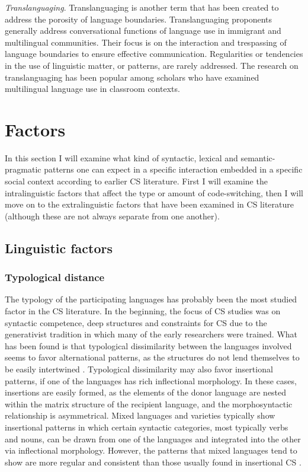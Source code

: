 \documentclass[output=paper,
modfonts
]{langscibook}
\begin{document}
\textit{Translanguaging}. \parencite{garcia2009education,creese2010translanguaging,garcia2014translanguaging} Translanguaging is another term that has been created to address the porosity of language boundaries. Translanguaging proponents generally address conversational functions of language use in immigrant and multilingual communities. Their focus is on the interaction and  trespassing of language boundaries to ensure effective communication. Regularities or tendencies in the use of linguistic matter, or patterns, are rarely addressed. The research on translanguaging has been popular among scholars who have examined multilingual language use in classroom contexts.

\section {Factors}

In this section I will examine what kind of syntactic, lexical and semantic-pragmatic patterns one can expect in a specific interaction embedded in a specific social context according to earlier CS literature. First I will examine the intralinguistic factors that affect the type or amount of code-switching, then I will move on to the extralinguistic factors that have been examined in CS literature (although these are not always separate from one another).

\subsection{Linguistic factors} 

\subsubsection*{Typological distance}


The typology of the participating languages has probably been the most studied factor in the CS literature. In the beginning, the focus of CS studies was on syntactic competence, deep structures and constraints for CS due to the generativist tradition in which many of the early researchers were trained. What has been found is that typological dissimilarity between the languages involved seems to favor alternational patterns, as the structures do not lend themselves to be easily intertwined \parencite{muysken2000,muysken2013language}. Typological dissimilarity may also favor insertional patterns, if one of the languages has rich inflectional morphology. In these cases, insertions are easily formed, as the elements of the donor language are nested within the matrix structure of the recipient language, and the morphosyntactic relationship is asymmetrical. Mixed languages and varieties typically show insertional patterns in which certain syntactic categories, most typically verbs and nouns, can be drawn from one of the languages and integrated into the other via inflectional morphology. However, the patterns that mixed languages tend to show are more regular and consistent than those usually found in insertional CS \parencite[pp. 290]{matras2009language}. 
\end{document}
